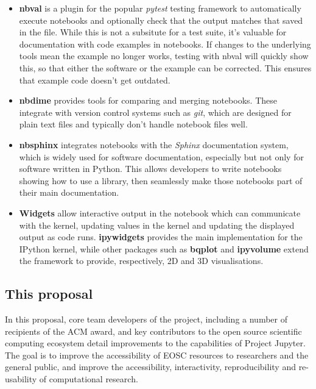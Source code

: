 \begin{itemize}
  \item \textbf{nbval} is a plugin for the popular \emph{pytest} testing
  framework to automatically execute notebooks and optionally check that the
  output matches that saved in the file. While this is not a subsitute for a
  test suite, it's valuable for documentation with code examples in notebooks.
  If changes to the underlying tools mean the example no longer
  works, testing with nbval will quickly show this, so that either the software
  or the example can be corrected. This ensures that example code doesn't
  get outdated.

  \item \textbf{nbdime} provides tools for comparing and merging notebooks.
  These integrate with version control systems such as \emph{git}, which
  are designed for plain text files and typically don't handle notebook files
  well.

  \item \textbf{nbsphinx} integrates notebooks with the \emph{Sphinx}
  documentation system, which is widely used for software documentation,
  especially but not only for software written in Python.
  This allows developers to write notebooks showing how to use a library,
  then seamlessly make those notebooks part of their main documentation.

  \item \textbf{Widgets} allow interactive output in the notebook which can
  communicate with the kernel, updating values in the kernel and updating the
  displayed output as code runs. \textbf{ipywidgets} provides the main
  implementation for the IPython kernel, while other packages such as
  \textbf{bqplot} and \textbf{ipyvolume} extend the framework to provide,
  respectively, 2D and 3D visualisations.
\end{itemize}

\subsection{This proposal}

In this proposal, core team developers of the project, including a
number of recipients of the ACM award, and key contributors to the
open source scientific computing ecosystem detail improvements to the
capabilities of Project Jupyter.  The goal is to improve the
accessibility of EOSC resources to researchers and the general public,
and improve the accessibility, interactivity, reproducibility and
re-usability of computational research.

